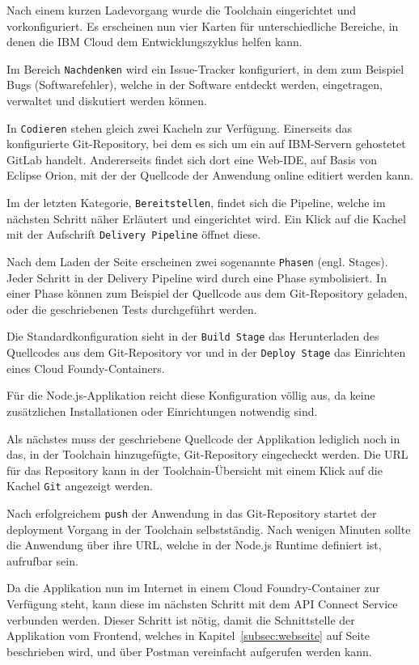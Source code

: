 Nach einem kurzen Ladevorgang wurde die Toolchain eingerichtet und vorkonfiguriert. Es erscheinen nun vier Karten für
unterschiedliche Bereiche, in denen die IBM Cloud dem Entwicklungszyklus helfen kann.

Im Bereich \texttt{Nachdenken} wird ein Issue-Tracker konfiguriert, in dem zum Beispiel Bugs (Softwarefehler), welche
in der Software entdeckt werden, eingetragen, verwaltet und diskutiert werden können.

In \texttt{Codieren} stehen gleich zwei Kacheln zur Verfügung. Einerseits das konfigurierte Git-Repository, bei dem es
sich um ein auf IBM-Servern gehostetet GitLab handelt. Andererseits findet sich dort eine Web-IDE, auf Basis von Eclipse
Orion, mit der der Quellcode der Anwendung online editiert werden kann.

Im der letzten Kategorie, \texttt{Bereitstellen}, findet sich die Pipeline, welche im nächsten Schritt näher Erläutert
und eingerichtet wird. Ein Klick auf die Kachel mit der Aufschrift \texttt{Delivery Pipeline} öffnet diese.

Nach dem Laden der Seite erscheinen zwei sogenannte \texttt{Phasen} (engl. Stages). Jeder Schritt in der Delivery Pipeline
wird durch eine Phase symbolisiert. In einer Phase können zum Beispiel der Quellcode aus dem Git-Repository geladen, oder
die geschriebenen Tests durchgeführt werden.

Die Standardkonfiguration sieht in der \texttt{Build Stage} das Herunterladen des Quellcodes aus dem Git-Repository vor
und in der \texttt{Deploy Stage} das Einrichten eines Cloud Foundy-Containers.

Für die Node.js-Applikation reicht diese Konfiguration völlig aus, da keine zusätzlichen Installationen oder Einrichtungen
notwendig sind.

Als nächstes muss der geschriebene Quellcode der Applikation lediglich noch in das, in der Toolchain hinzugefügte,
Git-Repository eingecheckt werden. Die URL für das Repository kann in der Toolchain-Übersicht mit einem Klick auf die
Kachel \texttt{Git} angezeigt werden.

Nach erfolgreichem \texttt{push} der Anwendung in das Git-Repository startet der deployment Vorgang in der Toolchain
selbstständig. Nach wenigen Minuten sollte die Anwendung über ihre URL, welche in der Node.js Runtime definiert ist,
aufrufbar sein.

Da die Applikation nun im Internet in einem Cloud Foundry-Container zur Verfügung steht, kann diese im nächsten Schritt
mit dem API Connect Service verbunden werden. Dieser Schritt ist nötig, damit die Schnittstelle der Applikation vom
Frontend, welches in Kapitel~\ref{subsec:webseite} auf Seite~\pageref{subsec:webseite} beschrieben wird, und über Postman
vereinfacht aufgerufen werden kann.

